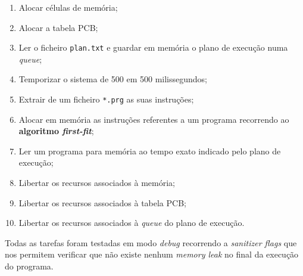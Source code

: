 \documentclass[a4paper,11pt,onecolumn,oneside]{article}
\begin{document}
	\begin{enumerate}
		\item Alocar células de memória;
		\item Alocar a tabela PCB;
		\item Ler o ficheiro \texttt{plan.txt} e guardar em memória o plano de execução numa \textit{queue};
		\item Temporizar o sistema de 500 em 500 milissegundos;
		\item Extrair de um ficheiro \texttt{*.prg} as suas instruções;
		\item Alocar em memória as instruções referentes a um programa recorrendo ao \textbf{algoritmo \textit{first-fit}};
		\item Ler um programa para memória ao tempo exato indicado pelo plano de execução;
		
		
		\item Libertar os recursos associados à memória;
		\item Libertar os recursos associados à tabela PCB;
		\item Libertar os recursos associados à \textit{queue} do plano de execução.
	\end{enumerate}
	
	Todas as tarefas foram testadas em modo \textit{debug} recorrendo a \textit{sanitizer flags} que nos permitem verificar que não existe nenhum \textit{memory leak} no final da execução do programa.
	
	
	
\end{document}
